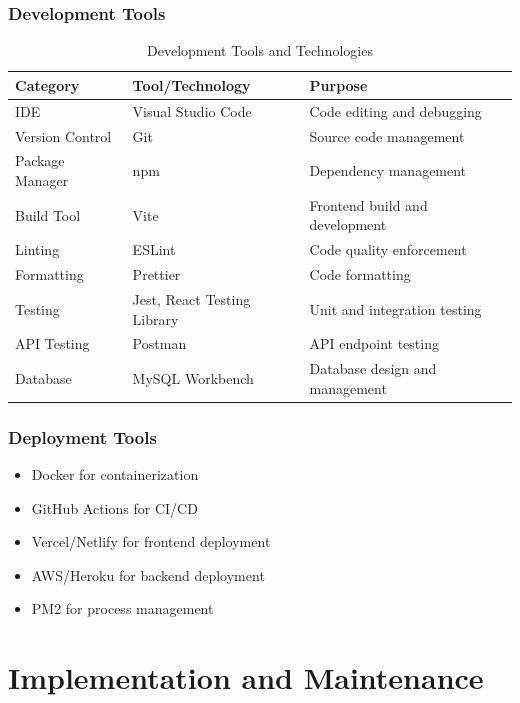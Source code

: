 \documentclass[12pt,a4paper]{article}
\begin{document}
\subsubsection{Development Tools}
\begin{table}[H]
    \centering
    \caption{Development Tools and Technologies}
    \label{tab:dev_tools}
    \begin{tabular}{@{}lll@{}}
        \toprule
        \textbf{Category} & \textbf{Tool/Technology} & \textbf{Purpose} \\
        \midrule
        IDE & Visual Studio Code & Code editing and debugging \\
        Version Control & Git & Source code management \\
        Package Manager & npm & Dependency management \\
        Build Tool & Vite & Frontend build and development \\
        Linting & ESLint & Code quality enforcement \\
        Formatting & Prettier & Code formatting \\
        Testing & Jest, React Testing Library & Unit and integration testing \\
        API Testing & Postman & API endpoint testing \\
        Database & MySQL Workbench & Database design and management \\
        \bottomrule
    \end{tabular}
\end{table}

\subsubsection{Deployment Tools}
\begin{itemize}
    \item Docker for containerization
    \item GitHub Actions for CI/CD
    \item Vercel/Netlify for frontend deployment
    \item AWS/Heroku for backend deployment
    \item PM2 for process management
\end{itemize}

\section{Implementation and Maintenance}
\end{document}
